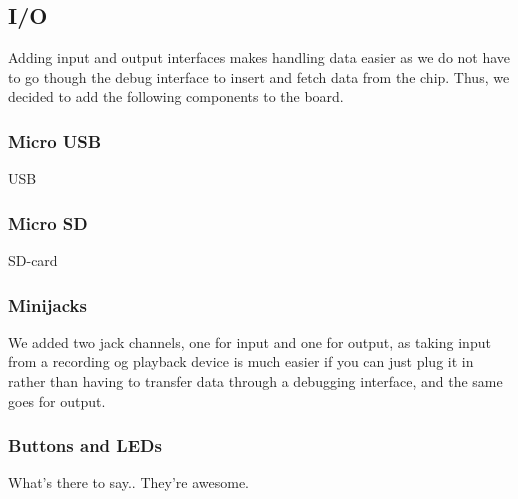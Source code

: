 \subsection{I/O} Adding input and output interfaces makes handling data easier
as we do not have to go though the debug interface to insert and fetch data from
the chip. Thus, we decided to add the following components to the
board.

\subsubsection{Micro USB} USB 

\subsubsection{Micro SD} SD-card 

\subsubsection{Minijacks} We added two jack channels, one for input and one for
output, as taking input from a recording og playback device is much easier if
you can just plug it in rather than having to transfer data through a debugging
interface, and the same goes for output.

\subsubsection{Buttons and LEDs} What's there to say.. They're
awesome.
